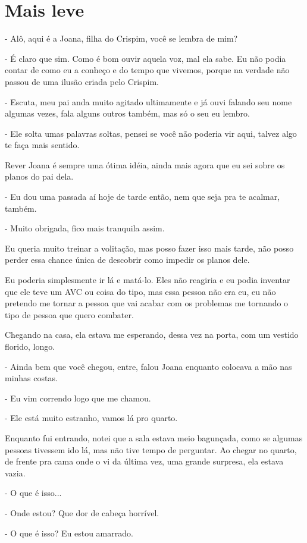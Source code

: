 \chapter{Mais leve}
- Alô, aqui é a Joana, filha do Crispim, você se lembra de mim?

- É claro que sim. Como é bom ouvir aquela voz, mal ela sabe. Eu não podia contar de como eu a conheço e do tempo que vivemos, porque na verdade não passou de uma ilusão criada pelo Crispim.

- Escuta, meu pai anda muito agitado ultimamente e já ouvi falando seu nome algumas vezes, fala alguns outros também, mas só o seu eu lembro.

- Ele solta umas palavras soltas, pensei se você não poderia vir aqui, talvez algo te faça mais sentido.

Rever Joana é sempre uma ótima idéia, ainda mais agora que eu sei sobre os planos do pai dela.

- Eu dou uma passada aí hoje de tarde então, nem que seja pra te acalmar, também.

- Muito obrigada, fico mais tranquila assim.

Eu queria muito treinar a volitação, mas posso fazer isso mais tarde, não posso perder essa chance única de descobrir como impedir os planos dele.

Eu poderia simplesmente ir lá e matá-lo. Eles não reagiria e eu podia inventar que ele teve um AVC ou coisa do tipo, mas essa pessoa não era eu, eu não pretendo me tornar a pessoa que vai acabar com os problemas me tornando o tipo de pessoa que quero combater.

Chegando na casa, ela estava me esperando, dessa vez na porta, com um vestido florido, longo.

- Ainda bem que você chegou, entre, falou Joana enquanto colocava a mão nas minhas costas.

- Eu vim correndo logo que me chamou.

- Ele está muito estranho, vamos lá pro quarto.

Enquanto fui entrando, notei que a sala estava meio bagunçada, como se algumas pessoas tivessem ido lá, mas não tive tempo de perguntar. Ao chegar no quarto, de frente pra cama onde o vi da última vez, uma grande surpresa, ela estava vazia.

- O que é isso...

- Onde estou? Que dor de cabeça horrível.

- O que é isso? Eu estou amarrado.

